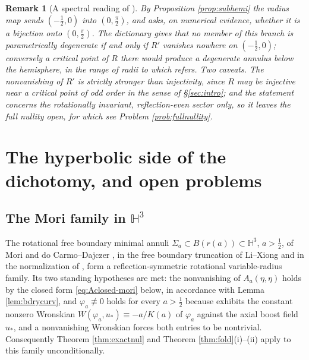 \documentclass[10pt,a4paper]{amsart}
\newtheorem{remark}[theorem]{Remark}
\newcommand{\Hyp}{\mathbb{H}}
\begin{document}
\begin{remark}[A spectral reading of {\cite[Rem. 3.5]{dO24}}]\label{rem:dO35}
By Proposition \ref{prop:subhemi} the radius map sends $(-\tfrac12,0)$ into $(0,\tfrac\pi2)$, and \cite[Rem. 3.5]{dO24} asks, on numerical evidence, whether it is a bijection onto $(0,\tfrac\pi2)$. The dictionary gives that no member of this branch is parametrically degenerate if and only if $R'$ vanishes nowhere on $(-\tfrac12,0)$; conversely a critical point of $R$ there would produce a degenerate annulus \emph{below} the hemisphere, in the range of radii
to which \cite[Q. 6.6]{NZ1} refers. Two caveats. The nonvanishing of $R'$ is strictly stronger than injectivity, since $R$ may be injective near a critical point of odd order in the sense of \S\ref{sec:intro}; and the statement concerns the rotationally invariant, reflection-even sector only, so it leaves the full nullity open, for which see Problem \ref{prob:fullnullity}.
\end{remark}

\section{The hyperbolic side of the dichotomy, and open problems}\label{sec:remarks}

\subsection*{The Mori family in \texorpdfstring{$\Hyp^3$}{H3}}

The rotational free boundary minimal annuli $\Sigma_a\subset B(r(a))\subset\Hyp^3$, $a>\tfrac12$, of Mori \cite{Mori81} and do Carmo--Dajczer \cite{dCD83}, in the free boundary truncation of Li--Xiong \cite[\S 2]{LX18} and in the normalization of \cite{P1,P2}, form a reflection-symmetric rotational variable-radius family. Its two standing hypotheses are met: the nonvanishing of $A_a(\eta,\eta)$ holds by the closed form \eqref{eq:Aclosed-mori} below, in accordance with Lemma \ref{lem:bdrycurv}, and $\varphi_a\not\equiv 0$ holds for every $a>\tfrac12$ because \cite[Lem. 11.1]{P1} exhibits the constant nonzero Wronskian $W(\varphi_a,u_*)\equiv-a/K(a)$ of $\varphi_a$ against the axial boost field $u_*$, and a nonvanishing Wronskian forces both entries to be nontrivial. Consequently Theorem \ref{thm:exactnul} and Theorem \ref{thm:fold}(i)--(ii) apply to this family unconditionally.
\end{document}
